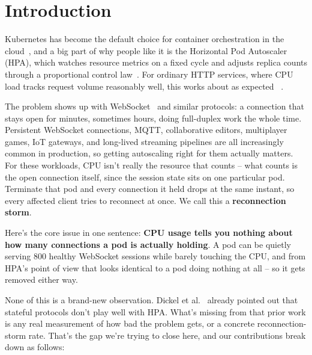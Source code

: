 \documentclass[pdflatex,sn-mathphys-num]{sn-jnl}
\theoremstyle{thmstyleone}%
\theoremstyle{thmstyletwo}%
\theoremstyle{thmstylethree}%
\begin{document}
\maketitle


\section{Introduction}
\label{sec:intro}

Kubernetes has become the default choice for container orchestration in the
cloud~\cite{hightower2017kubernetes,merkel2014docker}, and a big part of why people
like it is the Horizontal Pod Autoscaler (HPA), which watches resource metrics on a
fixed cycle and adjusts replica counts through a proportional control
law~\cite{k8s_hpa_docs,nguyen2020hpa,burns2016borg}. For ordinary HTTP services,
where CPU load tracks request volume reasonably well, this works about as expected
~\cite{casalicchio2019auto,lorido2014auto}.

The problem shows up with WebSocket~\cite{websocket_rfc} and similar protocols: a
connection that stays open for minutes, sometimes hours, doing full-duplex work the
whole time. Persistent WebSocket connections, MQTT, collaborative editors,
multiplayer games, IoT gateways, and long-lived streaming pipelines are all
increasingly common in production, so getting autoscaling right for them actually
matters. For these workloads, CPU isn't really the resource that counts --
what counts is the open connection itself, since the session state sits on one
particular pod. Terminate that pod and every connection it held drops at the same
instant, so every affected client tries to reconnect at once. We call this a
\textbf{reconnection storm}.

Here's the core issue in one sentence: \textbf{CPU usage tells you nothing about
how many connections a pod is actually holding}. A pod can be quietly serving 800
healthy WebSocket sessions while barely touching the CPU, and from HPA's point of
view that looks identical to a pod doing nothing at all -- so it gets removed
either way.

None of this is a brand-new observation. Dickel et al.~\cite{dickel2019evaluation}
already pointed out that stateful protocols don't play well with HPA. What's
missing from that prior work is any real measurement of how bad the problem gets, or
a concrete reconnection-storm rate. That's the gap we're trying to close here, and
our contributions break down as follows:
\end{document}
